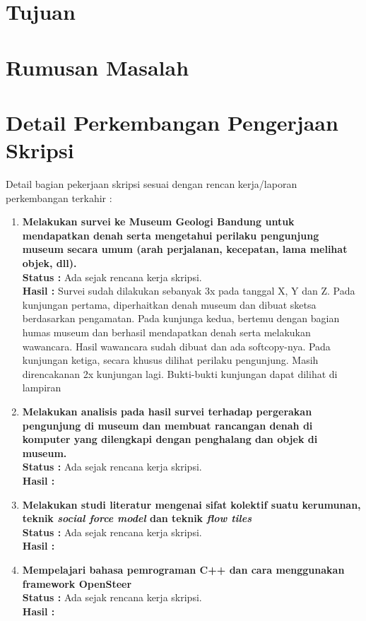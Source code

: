 \documentclass[a4paper,twoside]{article}
\begin{document}
\section{Tujuan}

\section{Rumusan Masalah}

\section{Detail Perkembangan Pengerjaan Skripsi}
Detail bagian pekerjaan skripsi sesuai dengan rencan kerja/laporan perkembangan terkahir :
	\begin{enumerate}
		\item \textbf{Melakukan survei ke Museum Geologi Bandung untuk mendapatkan denah serta mengetahui perilaku pengunjung museum secara umum (arah perjalanan, kecepatan, lama melihat objek, dll).}\\
		{\bf Status :} Ada sejak rencana kerja skripsi.\\
		{\bf Hasil :} Survei sudah dilakukan sebanyak 3x pada tanggal X, Y dan Z. Pada kunjungan pertama, diperhaitkan denah museum dan dibuat sketsa berdasarkan pengamatan. Pada kunjunga kedua, bertemu dengan bagian humas museum dan berhasil mendapatkan denah serta melakukan wawancara. Hasil wawancara sudah dibuat dan ada softcopy-nya. Pada kunjungan ketiga, secara khusus dilihat perilaku pengunjung. Masih direncakanan 2x kunjungan lagi. Bukti-bukti kunjungan dapat dilihat di lampiran
		
		\item \textbf{Melakukan analisis pada hasil survei terhadap pergerakan pengunjung di museum dan membuat rancangan denah di komputer yang dilengkapi dengan penghalang dan objek di museum.}\\
		{\bf Status :} Ada sejak rencana kerja skripsi.\\
		{\bf Hasil :}

		\item \textbf{Melakukan studi literatur mengenai sifat kolektif suatu kerumunan, teknik {\it social force model} dan teknik {\it flow tiles}}\\
		{\bf Status :} Ada sejak rencana kerja skripsi.\\
		{\bf Hasil :}

		\item \textbf{Mempelajari bahasa pemrograman C++ dan cara menggunakan framework OpenSteer}\\
		{\bf Status :} Ada sejak rencana kerja skripsi.\\
		{\bf Hasil :}


\end{enumerate}
\end{document}

